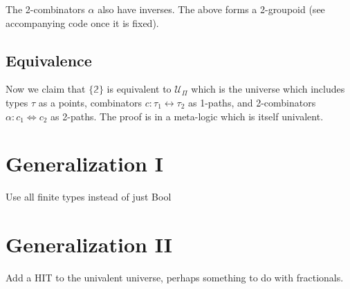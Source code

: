 \documentclass[format=acmlarge,review,natbib]{acmart}
\newcommand{\iso}{\leftrightarrow}
\newcommand{\isotwo}{\Leftrightarrow}
\newcommand{\bt}{\mathbb{2}}
\begin{document}
The 2-combinators $\alpha$ also have inverses. The above forms a 2-groupoid (see
accompanying code once it is fixed).

\subsection{Equivalence}

Now we claim that $\{\bt\}$ is equivalent to $\mathcal{U}_\Pi$ which is the
universe which includes types $\tau$ as a points, combinators
$c : \tau_1 \iso \tau_2$ as 1-paths, and 2-combinators
$\alpha : c_1 \isotwo c_2$ as 2-paths. The proof is in a meta-logic which is
itself univalent.

\section{Generalization I}

Use all finite types instead of just Bool

\section{Generalization II}

Add a HIT to the univalent universe, perhaps something to do with fractionals.


{\footnotesize

}
\end{document}
